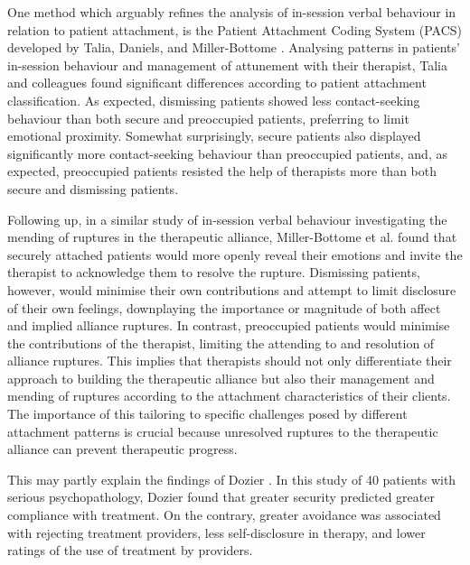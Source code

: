 \documentclass[12pt]{report}
\begin{document}
One method which arguably refines the analysis of in-session verbal behaviour in relation to patient attachment, is the Patient Attachment Coding System (PACS) developed by Talia, Daniels, and Miller-Bottome \cite{Talia2014, Talia2017}.
Analysing patterns in patients' in-session behaviour and management of attunement with their therapist, Talia and colleagues \cite{Talia2014} found significant differences according to patient attachment classification.
As expected, dismissing patients showed less contact-seeking behaviour than both secure and preoccupied patients, preferring to limit emotional proximity.
Somewhat surprisingly, secure patients also displayed significantly more contact-seeking behaviour than preoccupied patients, and, as expected, preoccupied patients resisted the help of therapists more than both secure and dismissing patients.

Following up, in a similar study of in-session verbal behaviour investigating the mending of ruptures in the therapeutic alliance, Miller-Bottome et al. \cite{MillerBottome2018} found that securely attached patients would more openly reveal their emotions and invite the therapist to acknowledge them to resolve the rupture.
Dismissing patients, however, would minimise their own contributions and attempt to limit disclosure of their own feelings, downplaying the importance or magnitude of both affect and implied alliance ruptures.
In contrast, preoccupied patients would minimise the contributions of the therapist, limiting the attending to and resolution of alliance ruptures.
This implies that therapists should not only differentiate their approach to building the therapeutic alliance but also their management and mending of ruptures according to the attachment characteristics of their clients. The importance of this tailoring to specific challenges posed by different attachment patterns is crucial because unresolved ruptures to the therapeutic alliance can prevent therapeutic progress.

This may partly explain the findings of Dozier \cite{Dozier1990}.
In this study of 40 patients with serious psychopathology, Dozier found that greater security predicted greater compliance with treatment.
On the contrary, greater avoidance was associated with rejecting treatment providers, less self-disclosure in therapy, and lower ratings of the use of treatment by providers.
\end{document}
